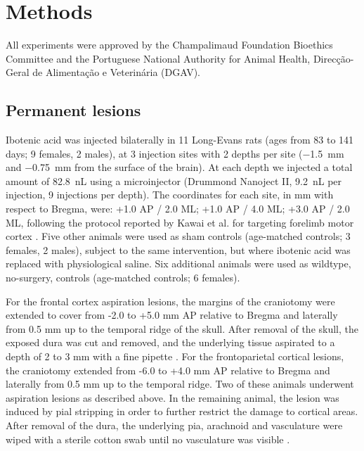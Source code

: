 \section{Methods}

All experiments were approved by the Champalimaud Foundation Bioethics Committee and the Portuguese National Authority for Animal Health, Direcção\hyp{}Geral de Alimentação e Veterinária (DGAV).

\subsection{Permanent lesions}

Ibotenic acid was injected bilaterally in 11 Long-Evans rats (ages from 83 to 141 days; 9 females, 2 males), at 3 injection sites with 2 depths per site (\SI{-1.5}{\milli\meter} and \SI{-0.75}{\milli\meter} from the surface of the brain). At each depth we injected a total amount of \SI{82.8}{\nano\liter} using a microinjector (Drummond Nanoject II, \SI{9.2}{\nano\liter} per injection, 9 injections per depth). The coordinates for each site, in \si{\milli\meter} with respect to Bregma, were: +1.0 AP / 2.0 ML; +1.0 AP / 4.0 ML; +3.0 AP / 2.0 ML, following the protocol reported by Kawai et al. for targeting forelimb motor cortex \citep{Kawai2015}. Five other animals were used as sham controls (age-matched controls; 3 females, 2 males), subject to the same intervention, but where ibotenic acid was replaced with physiological saline. Six additional animals were used as wildtype, no-surgery, controls (age-matched controls; 6 females).

For the frontal cortex aspiration lesions, the margins of the craniotomy were extended to cover from -2.0 to +5.0 \si{\milli\meter} AP relative to Bregma and laterally from 0.5 \si{\milli\meter} up to the temporal ridge of the skull. After removal of the skull, the exposed dura was cut and removed, and the underlying tissue aspirated to a depth of 2 to 3 \si{\milli\meter} with a fine pipette \citep{Whishaw2000}. For the frontoparietal cortical lesions, the craniotomy extended from -6.0 to +4.0 \si{\milli\meter} AP relative to Bregma and laterally from 0.5 \si{\milli\meter} up to the temporal ridge. Two of these animals underwent aspiration lesions as described above. In the remaining animal, the lesion was induced by pial stripping in order to further restrict the damage to cortical areas. After removal of the dura, the underlying pia, arachnoid and vasculature were wiped with a sterile cotton swab until no vasculature was visible \citep{Farr2002}.

